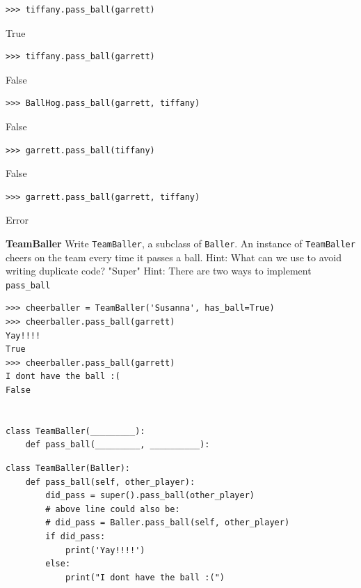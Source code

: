 \documentclass{exam}
\begin{document}
\begin{questions}
\begin{blocksection}
\begin{lstlisting}
>>> tiffany.pass_ball(garrett)
\end{lstlisting}
\begin{solution}[.2in]
True
\end{solution}

\begin{lstlisting}
>>> tiffany.pass_ball(garrett)
\end{lstlisting}
\begin{solution}[.2in]
False
\end{solution}

\begin{lstlisting}
>>> BallHog.pass_ball(garrett, tiffany)
\end{lstlisting}
\begin{solution}[.2in]
False
\end{solution}

\begin{lstlisting}
>>> garrett.pass_ball(tiffany)
\end{lstlisting}
\begin{solution}[.2in]
False
\end{solution}

\begin{lstlisting}
>>> garrett.pass_ball(garrett, tiffany)
\end{lstlisting}
\begin{solution}[.2in]
Error
\end{solution}
\end{blocksection}

\begin{blocksection}
\question \textbf{TeamBaller} \newline
Write \texttt{TeamBaller}, a subclass of \texttt{Baller}. An instance of \texttt{TeamBaller} cheers on the team every time it passes a ball.  \newline
Hint: What can we use to avoid writing duplicate code? \newline
"Super" Hint: There are two ways to implement \texttt{pass\_ball} \newline

\begin{lstlisting}
>>> cheerballer = TeamBaller('Susanna', has_ball=True)
>>> cheerballer.pass_ball(garrett)
Yay!!!!
True
>>> cheerballer.pass_ball(garrett)
I dont have the ball :(
False


class TeamBaller(_________):
    def pass_ball(_________, __________):
\end{lstlisting}
\begin{solution}[1in]
\begin{lstlisting}
class TeamBaller(Baller):
    def pass_ball(self, other_player):
        did_pass = super().pass_ball(other_player) 
        # above line could also be:
        # did_pass = Baller.pass_ball(self, other_player)
        if did_pass:
            print('Yay!!!!')
        else:
            print("I dont have the ball :(")
\end{lstlisting}
\end{solution}
\end{blocksection}


\end{questions}
\end{document}
